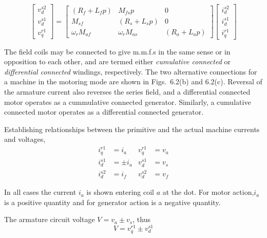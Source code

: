 \documentclass[a4paper,numbers=noenddot,12pt]{scrbook}
\begin{document}
        \begin{equation}
            \begin{bmatrix}
                v_d^{s2}\\[2ex] v_d^{s1}\\[2ex] v_q^{r1}
            \end{bmatrix} =
            \begin{bmatrix}
                (R_f + L_f p) & M_{fs} p & 0 \\[2ex]
                M_{sf} & (R_s + L_s p) & 0 \\[2ex]
                \omega_r M_{af} & \omega_r M_{as} & (R_a + L_a p)
            \end{bmatrix}
            \begin{bmatrix}
                i_d^{s2} \\[2ex] i_d^{s1} \\[2ex] i_q^{r1}
            \end{bmatrix}
            \label{}
        \end{equation}

        The field coils may be connected to give m.m.f.s in the same sense or in opposition to each other, and are termed either \textit{cumulative connected} or \textit{differential connected} windings, respectively. The two alternative connections for a machine in the motoring mode are shown in Figs.\ 6.2(b) and 6.2(c).
        Reversal of the armature current also reverses the series field, and a differential connected motor operates as a cummulative connected generator. Similarly, a cumulative connected motor operates as a differential connected generator.

        Establishing relationships between the primitive and the actual machine currents and voltages,
        \begin{align*}
            i_q^{r1} & = i_a & v_q^{r1} & = v_a \\[2ex]
            i_d^{s1} & = \pm i_a & v_d^{s1} & = v_s \\[2ex]
            i_d^{s2} & = i_f & v_d^{s2} & = v_f
        \end{align*}

        In all cases the current $i_a$ is shown entering coil $a$ at the dot. For motor action,$i_a$ is a positive quantity and for generator action is a negative quantity.

        The armature circuit voltage $V=v_a\pm v_s$, thus
        \begin{equation*}
            V=v_q^{r1} \pm v_d^{s1}
            \label{}
        \end{equation*}
\end{document}
